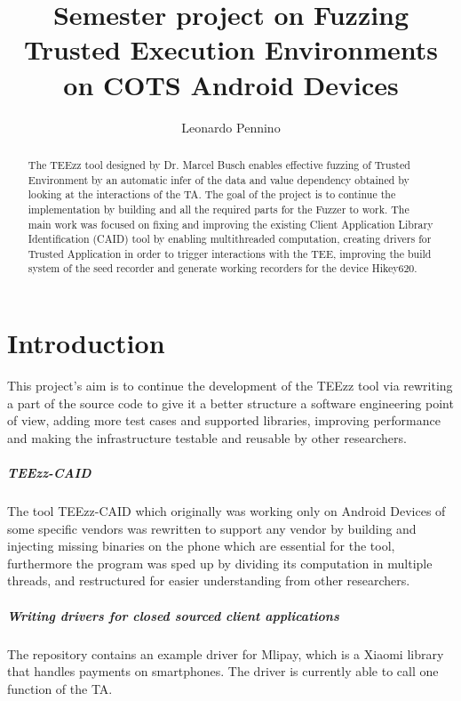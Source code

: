 \documentclass[a4paper,11pt,oneside]{report}
\title{Semester project on Fuzzing Trusted Execution Environments on COTS Android Devices}
\author{Leonardo Pennino}
\newcommand{\sysname}{TEEzz\xspace}
\begin{document}
\maketitle
\makeacks

\begin{abstract}
  The \sysname \cite{TEEzz} tool designed by Dr. Marcel Busch enables effective fuzzing of
Trusted Environment by an automatic infer of the data and value dependency
obtained by looking at the interactions of the TA.
The goal of the project is to continue the implementation by building and all
the required parts for the Fuzzer to work. The main work was focused on fixing
and improving the existing Client Application Library Identification (CAID)
tool by enabling multithreaded computation, creating drivers for Trusted
Application in order to trigger interactions with the TEE, improving the build system of the seed recorder and generate working recorders
for the device Hikey620.
\end{abstract}

\maketoc

\chapter{Introduction}

This project's aim is to continue the development of the TEEzz tool via rewriting
a part of the source code to give it a better structure a software engineering
point of view, adding more test cases and supported libraries, improving performance and making the infrastructure testable
and reusable by other researchers.
\paragraph{TEEzz-CAID}
The tool TEEzz-CAID which originally was working only on Android Devices of
some specific vendors was rewritten to support any vendor by building and
injecting missing binaries on the phone which are essential for the tool,
furthermore the program was sped up by dividing its computation in multiple
threads, and restructured for easier understanding from other researchers.
\paragraph{Writing drivers for closed sourced client applications}
The repository contains an example driver for Mlipay, which is a Xiaomi library
that handles payments on smartphones. The driver is currently able to call one function
of the TA.
\end{document}
